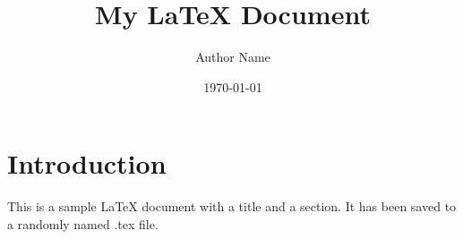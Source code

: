 \documentclass{article}
\title{My LaTeX Document}
\author{Author Name}
\date{\today}
\begin{document}
\maketitle

\section{Introduction}
This is a sample LaTeX document with a title and a section. It has been saved to a randomly named .tex file.
\end{document}
